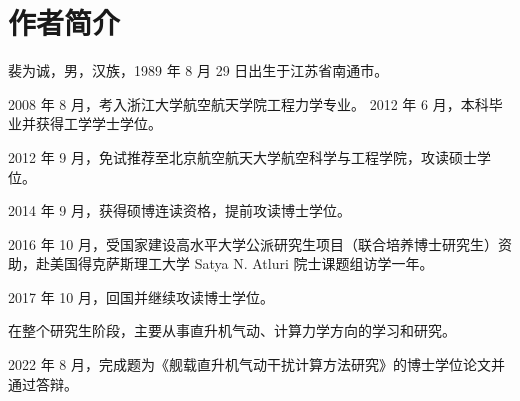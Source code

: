 \documentclass[doctor,openright,twoside,AutoFakeBold=true]{buaathesis}
\theoremstyle{plain}
\theoremstyle{definition}
\theoremstyle{plain}
\theoremstyle{plain}
\theoremstyle{remark}
\theoremstyle{remark}
\theoremstyle{definition}
\theoremstyle{plain}
\theoremstyle{definition}
\theoremstyle{plain}
\theoremstyle{plain}
\theoremstyle{remark}
\theoremstyle{plain}
\theoremstyle{definition}
\theoremstyle{remark}
\theoremstyle{plain}
\theoremstyle{remark}
\theoremstyle{definition}
\theoremstyle{plain}
\theoremstyle{plain}
\theoremstyle{definition}
\theoremstyle{plain}
\theoremstyle{plain}
\theoremstyle{definition}
\begin{document}
\maketitle
\pagestyle{frontmatter}

{}
\tableofcontents

\begingroup

\renewcommand\citet[2][]{}
\renewcommand\cite[2][]{}
\renewcommand\upcite[2][]{}

\cleardoublepage
{}
{}
\listoffigures

\cleardoublepage
{}
{}
\listoftables

\endgroup
\printnomenclature

\mainmatter
\pagestyle{mainmatter}




\cleardoublepage
{}
{}

\cleardoublepage

\appendix
% 

\backmatter




\chapter{作者简介}
裴为诚，男，汉族，1989 年 8 月 29 日出生于江苏省南通市。

2008 年 8 月，考入浙江大学航空航天学院工程力学专业。
2012 年 6 月，本科毕业并获得工学学士学位。

2012 年 9 月，免试推荐至北京航空航天大学航空科学与工程学院，攻读硕士学位。

2014 年 9 月，获得硕博连读资格，提前攻读博士学位。

2016 年 10 月，受国家建设高水平大学公派研究生项目（联合培养博士研究生）资助，赴美国得克萨斯理工大学 Satya N. Atluri 院士课题组访学一年。

2017 年 10 月，回国并继续攻读博士学位。

在整个研究生阶段，主要从事直升机气动、计算力学方向的学习和研究。

2022 年 8 月，完成题为《舰载直升机气动干扰计算方法研究》的博士学位论文并通过答辩。
\end{document}
